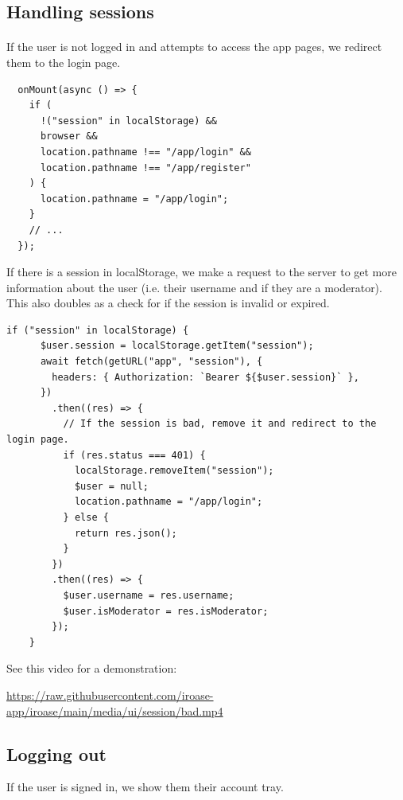 \documentclass{report}
\begin{document}
\subsection{Handling sessions}
\paragraph{}
If the user is not logged in and attempts to access the app pages, we redirect them to the login page.

\begin{verbatim}
  onMount(async () => {
    if (
      !("session" in localStorage) &&
      browser &&
      location.pathname !== "/app/login" &&
      location.pathname !== "/app/register"
    ) {
      location.pathname = "/app/login";
    }
    // ...
  });
\end{verbatim}

If there is a session in localStorage, we make a request to the server to get more information about the user (i.e. their username and if they are a moderator). This also doubles as a check for if the session is invalid or expired.

\begin{verbatim}
if ("session" in localStorage) {
      $user.session = localStorage.getItem("session");
      await fetch(getURL("app", "session"), {
        headers: { Authorization: `Bearer ${$user.session}` },
      })
        .then((res) => {
          // If the session is bad, remove it and redirect to the login page.
          if (res.status === 401) {
            localStorage.removeItem("session");
            $user = null;
            location.pathname = "/app/login";
          } else {
            return res.json();
          }
        })
        .then((res) => {
          $user.username = res.username;
          $user.isModerator = res.isModerator;
        });
    }
\end{verbatim}

See this video for a demonstration:

\href{https://raw.githubusercontent.com/iroase-app/iroase/main/media/ui/session/bad.mp4}{https://raw.githubusercontent.com/iroase-app/iroase/main/media/ui/session/bad.mp4}

\subsection{Logging out}

If the user is signed in, we show them their account tray.
\end{document}
